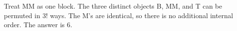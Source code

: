Treat MM as one block. The three distinct objects B, MM, and T can be permuted in $3!$ ways. The M's are identical, so there is no additional internal order. The answer is $\boxed6$.
